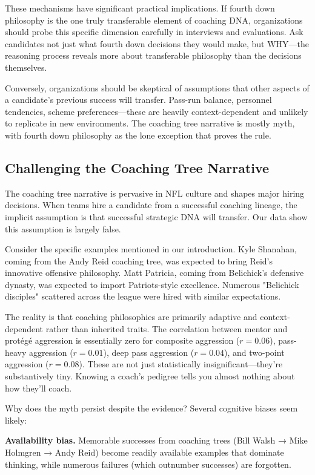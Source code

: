 \documentclass[11pt,twocolumn]{article}
\begin{document}
These mechanisms have significant practical implications. If fourth down philosophy is the one truly transferable element of coaching DNA, organizations should probe this specific dimension carefully in interviews and evaluations. Ask candidates not just what fourth down decisions they would make, but WHY---the reasoning process reveals more about transferable philosophy than the decisions themselves.

Conversely, organizations should be skeptical of assumptions that other aspects of a candidate's previous success will transfer. Pass-run balance, personnel tendencies, scheme preferences---these are heavily context-dependent and unlikely to replicate in new environments. The coaching tree narrative is mostly myth, with fourth down philosophy as the lone exception that proves the rule.

\subsection{Challenging the Coaching Tree Narrative}

The coaching tree narrative is pervasive in NFL culture and shapes major hiring decisions. When teams hire a candidate from a successful coaching lineage, the implicit assumption is that successful strategic DNA will transfer. Our data show this assumption is largely false.

Consider the specific examples mentioned in our introduction. Kyle Shanahan, coming from the Andy Reid coaching tree, was expected to bring Reid's innovative offensive philosophy. Matt Patricia, coming from Belichick's defensive dynasty, was expected to import Patriots-style excellence. Numerous "Belichick disciples" scattered across the league were hired with similar expectations.

The reality is that coaching philosophies are primarily adaptive and context-dependent rather than inherited traits. The correlation between mentor and protégé aggression is essentially zero for composite aggression ($r=0.06$), pass-heavy aggression ($r=0.01$), deep pass aggression ($r=0.04$), and two-point aggression ($r=0.08$). These are not just statistically insignificant---they're substantively tiny. Knowing a coach's pedigree tells you almost nothing about how they'll coach.

Why does the myth persist despite the evidence? Several cognitive biases seem likely:

\textbf{Availability bias.} Memorable successes from coaching trees (Bill Walsh → Mike Holmgren → Andy Reid) become readily available examples that dominate thinking, while numerous failures (which outnumber successes) are forgotten.
\end{document}
